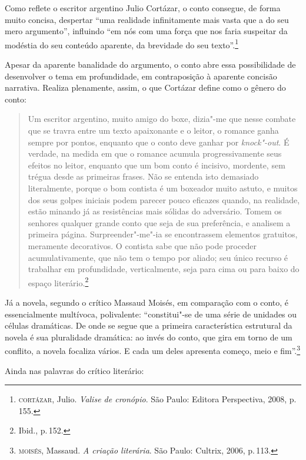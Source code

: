 Como reflete o escritor argentino Julio Cortázar, o conto consegue, de forma muito concisa, despertar ``uma realidade infinitamente mais vasta que a do seu mero argumento'', influindo ``em nós com uma força que nos faria suspeitar da modéstia do seu conteúdo aparente, da brevidade do seu texto''.\footnote{\textsc{cortázar}, Julio. \textit{Valise de cronópio}. São Paulo: Editora Perspectiva, 2008, p.\,155.}

Apesar da aparente banalidade do argumento, o conto abre essa possibilidade de desenvolver o tema em profundidade, em contraposição à aparente concisão narrativa. Realiza plenamente, assim, o que Cortázar define como o gênero do conto:

\begin{quote}
Um escritor argentino, muito amigo do boxe, dizia"-me que nesse combate que se travra entre um texto apaixonante e o leitor, o romance ganha sempre por pontos, enquanto que o conto deve ganhar por \textit{knock"-out}. É verdade, na medida em que o romance acumula progressivamente seus efeitos no leitor, enquanto que um bom conto é incisivo, mordente, sem trégua desde as primeiras frases. Não se entenda isto demasiado literalmente, porque o bom contista é um boxeador muito astuto, e muitos dos seus golpes iniciais podem parecer pouco eficazes quando, na realidade, estão minando já as resistências mais sólidas do adversário.
Tomem os senhores qualquer grande conto que seja de sua preferência, e analisem a primeira página. Surpreender"-me"-ia se encontrassem elementos gratuitos, meramente decorativos. O contista sabe que não pode proceder acumulativamente, que não tem o tempo por aliado; seu único recurso é trabalhar em profundidade, verticalmente, seja para cima ou para baixo do espaço literário.\footnote{Ibid., p.\,152.}
\end{quote}

Já a novela, segundo o crítico Massaud Moisés, em comparação com o conto, é essencialmente multívoca, polivalente: ``constitui"-se de uma série de unidades ou células dramáticas. De onde se segue que a primeira característica estrutural da novela é sua pluralidade dramática: ao invés do conto, que gira em torno de um conflito, a novela focaliza vários. E cada um deles apresenta começo, meio e fim''.\footnote{\textsc{moisés}, Massaud. \textit{A criação literária}. São Paulo: Cultrix, 2006, p.\,113.}

Ainda nas palavras do crítico literário:

